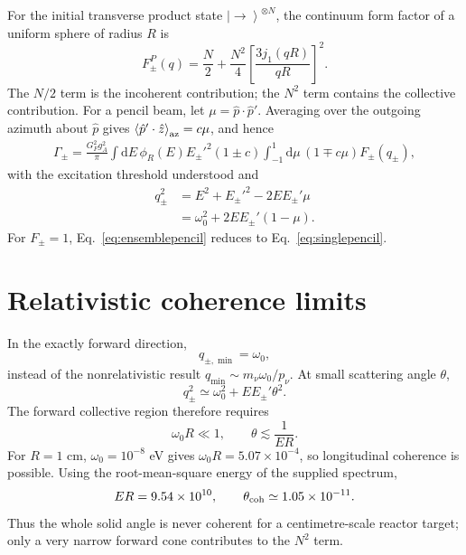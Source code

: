\documentclass[aps,prd,10pt,onecolumn,nofootinbib,amsmath,amssymb]{revtex4-1}
\newcommand{\dd}{\mathrm{d}}
\newcommand{\vev}[1]{\left\langle #1\right\rangle}
\begin{document}
For the initial transverse product state
\(\left|\rightarrow\right\rangle^{\otimes N}\), the continuum form factor
of a uniform sphere of radius \(R\) is
\begin{equation}
 F_\pm^P(q)
 =\frac{N}{2}
 +\frac{N^2}{4}
 \left[\frac{3j_1(qR)}{qR}\right]^2 .
\label{eq:sphereF}
\end{equation}
The \(N/2\) term is the incoherent contribution; the \(N^2\) term contains
the collective contribution.  For a pencil beam, let
\(\mu=\hat p\cdot\hat p'\).  Averaging over the outgoing azimuth about
\(\hat p\) gives
\(\vev{\hat p'\cdot\hat z}_{\rm az}=c\mu\), and hence
\begin{equation}
\boxed{
\begin{aligned}
 \Gamma_\pm
 =\frac{G_F^2g_A^2}{\pi}
 \int\dd E\,\phi_R(E)E_\pm'^2(1\pm c)
 \int_{-1}^{1}\dd\mu\,(1\mp c\mu)F_\pm(q_\pm),
\end{aligned}}
\label{eq:ensemblepencil}
\end{equation}
with the excitation threshold understood and
\begin{equation}
\begin{aligned}
 q_\pm^2
 &=E^2+E_\pm'^2-2EE_\pm'\mu\\
 &=\omega_0^2+2EE_\pm'(1-\mu).
\end{aligned}
\label{eq:qrel}
\end{equation}
For \(F_\pm=1\), Eq.~\eqref{eq:ensemblepencil} reduces to
Eq.~\eqref{eq:singlepencil}.

\section{Relativistic coherence limits}
\label{sec:coherence}

In the exactly forward direction,
\begin{equation}
 q_{\pm,\min}=\omega_0,
\label{eq:qmin}
\end{equation}
instead of the nonrelativistic result
\(q_{\min}\sim m_\nu\omega_0/p_\nu\).  At small scattering angle
\(\theta\),
\begin{equation}
 q_\pm^2\simeq\omega_0^2+EE_\pm'\theta^2.
\label{eq:qsmall}
\end{equation}
The forward collective region therefore requires
\begin{equation}
 \omega_0R\ll1,
\qquad
 \theta\lesssim\frac{1}{ER}.
\label{eq:cohconditions}
\end{equation}
For \(R=1\) cm, \(\omega_0=10^{-8}\) eV gives
\(\omega_0R=5.07\times10^{-4}\), so longitudinal coherence is possible.
Using the root-mean-square energy of the supplied spectrum,
\begin{equation}
 ER=9.54\times10^{10},
\qquad
 \theta_{\rm coh}\simeq1.05\times10^{-11}.
\end{equation}
Thus the whole solid angle is never coherent for a centimetre-scale
reactor target; only a very narrow forward cone contributes to the
\(N^2\) term.
\end{document}
